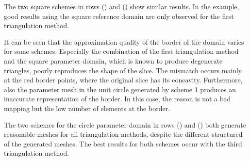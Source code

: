 The two square schemes in rows () and () show similar results. In the example, good results using the square reference domain are only observed for the first triangulation method.

It can be seen that the approximation quality of the border of the domain varies for some schemes. Especially the combination of the first triangulation method and the square parameter domain, which is known to produce degenerate triangles, poorly reproduces the shape of the slice. The mismatch occurs mainly at the red border points, where the original slice has its concavity. Furthermore, also the parameter mesh in the unit circle generated by scheme 1 produces an inaccurate representation of the border. In this case, the reason is not a bad mapping but the low number of elements at the border.

The two schemes for the circle parameter domain in rows () and () both generate reasonable meshes for all triangulation methods, despite the different structured of the generated meshes. The best results for both schemes occur with the third triangulation method.

